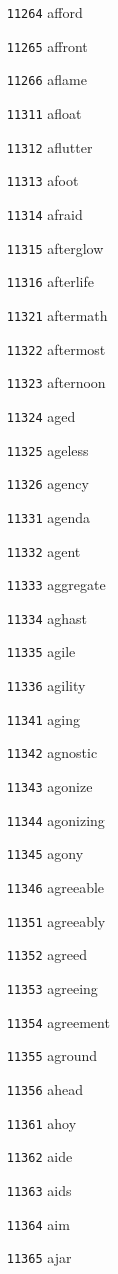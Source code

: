 \documentclass[twoside,11pt]{article}
\begin{document}
\begin{multicols}{5}
\begin{enumerate}
\item[\texttt{11264}] afford
\item[\texttt{11265}] affront
\item[\texttt{11266}] aflame
\item[\texttt{11311}] afloat
\item[\texttt{11312}] aflutter
\item[\texttt{11313}] afoot
\item[\texttt{11314}] afraid
\item[\texttt{11315}] afterglow
\item[\texttt{11316}] afterlife
\item[\texttt{11321}] aftermath
\item[\texttt{11322}] aftermost
\item[\texttt{11323}] afternoon
\item[\texttt{11324}] aged
\item[\texttt{11325}] ageless
\item[\texttt{11326}] agency
\item[\texttt{11331}] agenda
\item[\texttt{11332}] agent
\item[\texttt{11333}] aggregate
\item[\texttt{11334}] aghast
\item[\texttt{11335}] agile
\item[\texttt{11336}] agility
\item[\texttt{11341}] aging
\item[\texttt{11342}] agnostic
\item[\texttt{11343}] agonize
\item[\texttt{11344}] agonizing
\item[\texttt{11345}] agony
\item[\texttt{11346}] agreeable
\item[\texttt{11351}] agreeably
\item[\texttt{11352}] agreed
\item[\texttt{11353}] agreeing
\item[\texttt{11354}] agreement
\item[\texttt{11355}] aground
\item[\texttt{11356}] ahead
\item[\texttt{11361}] ahoy
\item[\texttt{11362}] aide
\item[\texttt{11363}] aids
\item[\texttt{11364}] aim
\item[\texttt{11365}] ajar

\end{enumerate}
\end{multicols}
\end{document}
